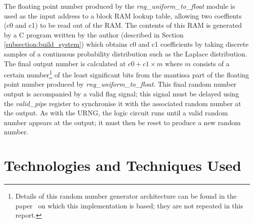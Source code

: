 \documentclass[12pt]{article}
\begin{document}
        The floating point number produced by the \textit{rng\_uniform\_to\_float} module is used as the input address to a block RAM lookup table, allowing two coeffients (c0 and c1) to be read out of the RAM. The contents of this RAM is generated by a C program written by the author (described in Section \ref{subsection:build_system}) which obtains c0 and c1 coefficients by taking discrete samples of a continuous probability distribution such as the Laplace distribution. The final output number is calculated at $c0 + c1 \times m$ where $m$ consists of a certain number\footnote{Details of this random number generator architecture can be found in the paper~\cite{DeSchryver} on which this implementation is based; they are not repeated in this report.} of the least significant bits from the mantissa part of the floating point number produced by \textit{rng\_uniform\_to\_float}. This final random number output is accompanied by a valid flag signal; this signal must be delayed using the \textit{valid\_pipe} register to synchronise it with the associated random number at the output. As with the URNG, the logic circuit runs until a valid random number appears at the output; it must then be reset to produce a new random number.

\newpage



%
%

\section{Technologies and Techniques Used} \label{section:tech}
\end{document}

